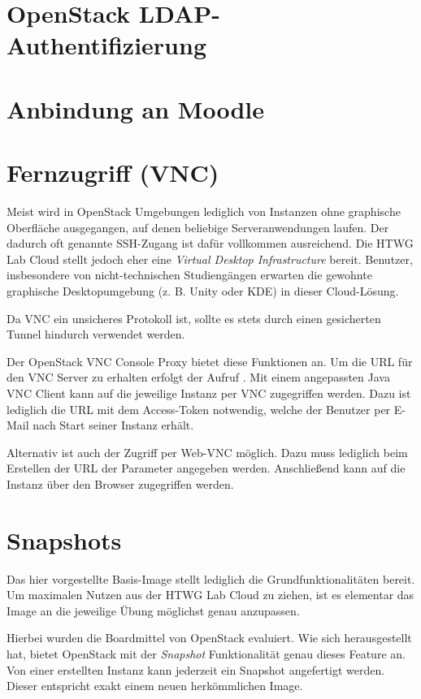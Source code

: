 \section{OpenStack LDAP-Authentifizierung}\label{ldap_auth1}

\section{Anbindung an Moodle}


\section{Fernzugriff (VNC)}

Meist wird in OpenStack Umgebungen lediglich von Instanzen ohne graphische Oberfläche ausgegangen, auf denen beliebige Serveranwendungen laufen. 
Der dadurch oft genannte SSH-Zugang ist dafür vollkommen ausreichend.
Die HTWG Lab Cloud stellt jedoch eher eine \emph{Virtual Desktop Infrastructure} bereit.
Benutzer, insbesondere von nicht-technischen Studiengängen erwarten die gewohnte graphische Desktopumgebung (z. B. Unity oder KDE) in dieser Cloud-Lösung.

Da VNC ein unsicheres Protokoll ist, sollte es stets durch einen gesicherten Tunnel hindurch verwendet werden.

Der OpenStack VNC Console Proxy bietet diese Funktionen an.
Um die URL für den VNC Server zu erhalten erfolgt der Aufruf .
Mit einem angepassten Java VNC Client \cite{vncJava} kann auf die jeweilige Instanz per VNC zugegriffen werden. 
Dazu ist lediglich die URL mit dem Access-Token notwendig, welche der Benutzer per E-Mail nach Start seiner Instanz erhält.

Alternativ ist auch der Zugriff per Web-VNC möglich. 
Dazu muss lediglich beim Erstellen der URL der Parameter  angegeben werden. 
Anschließend kann auf die Instanz über den Browser zugegriffen werden.

\section{Snapshots}

Das hier vorgestellte Basis-Image stellt lediglich die Grundfunktionalitäten bereit. 
Um maximalen Nutzen aus der HTWG Lab Cloud zu ziehen, ist es elementar das Image an die jeweilige Übung möglichst genau anzupassen.

Hierbei wurden die Boardmittel von OpenStack evaluiert.
Wie sich herausgestellt hat, bietet OpenStack mit der \emph{Snapshot} Funktionalität genau dieses Feature an.
Von einer erstellten Instanz kann jederzeit ein Snapshot angefertigt werden.
Dieser entspricht exakt einem neuen herkömmlichen Image.

